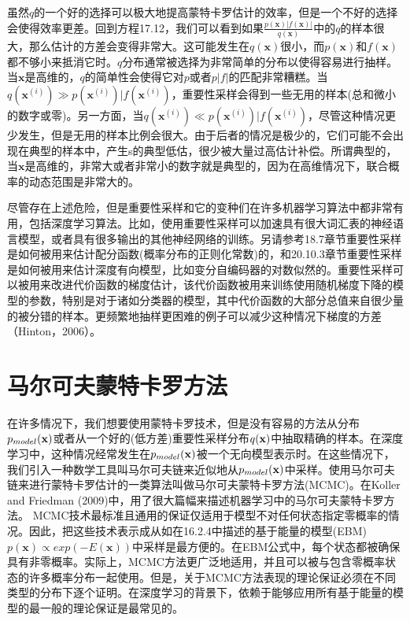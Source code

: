 虽然\(q\)的一个好的选择可以极大地提高蒙特卡罗估计的效率，但是一个不好的选择会使得效率更差。回到方程17.12，我们可以看到如果\( \frac { p(\bm{x})|f(\bm{x})| }{ q(\bm{x}) } \)中的\(q\)的样本很大，那么估计的方差会变得非常大。这可能发生在\(q(\bm{x})\)很小，而\(p(\bm{x})\)和\(f(\bm{x})\)都不够小来抵消它时。\(q\)分布通常被选择为非常简单的分布以使得容易进行抽样。当\(\bm{x}\)是高维的，\(q\)的简单性会使得它对\(p\)或者\(p|f|\)的匹配非常糟糕。当\(q({\bm{x}}^{ (i) })\gg p({\bm{x}}^{ (i) })|f({\bm{x}}^{ (i) })\)，重要性采样会得到一些无用的样本(总和微小的数字或零)。另一方面，当\(q({\bm{x}}^{ (i) })\ll p({\bm{x}}^{ (i) })|f({\bm{x}}^{ (i) })\)，尽管这种情况更少发生，但是无用的样本比例会很大。由于后者的情况是极少的，它们可能不会出现在典型的样本中，产生s的典型低估，很少被大量过高估计补偿。所谓典型的，当\(\bm{x}\)是高维的，非常大或者非常小的数字就是典型的，因为在高维情况下，联合概率的动态范围是非常大的。

尽管存在上述危险，但是重要性采样和它的变种们在许多机器学习算法中都非常有用，包括深度学习算法。比如，使用重要性采样可以加速具有很大词汇表的神经语言模型，或者具有很多输出的其他神经网络的训练。另请参考18.7章节重要性采样是如何被用来估计配分函数(概率分布的正则化常数)的，和20.10.3章节重要性采样是如何被用来估计深度有向模型，比如变分自编码器的对数似然的。重要性采样可以被用来改进代价函数的梯度估计，该代价函数被用来训练使用随机梯度下降的模型的参数，特别是对于诸如分类器的模型，其中代价函数的大部分总值来自很少量的被分错的样本。更频繁地抽样更困难的例子可以减少这种情况下梯度的方差（Hinton，2006）。

\section{马尔可夫蒙特卡罗方法}
在许多情况下，我们想要使用蒙特卡罗技术，但是没有容易的方法从分布\({ p }_{ model }(\bf{x})\)或者从一个好的(低方差)重要性采样分布\(q(\bf{x})\)中抽取精确的样本。在深度学习中，这种情况经常发生在\({ p }_{ model }(\bf{x})\)被一个无向模型表示时。在这些情况下，我们引入一种数学工具叫马尔可夫链来近似地从\({ p }_{ model }(\bf{x})\)中采样。使用马尔可夫链来进行蒙特卡罗估计的一类算法叫做马尔可夫蒙特卡罗方法(MCMC)。在Koller and Friedman (2009)中，用了很大篇幅来描述机器学习中的马尔可夫蒙特卡罗方法。
MCMC技术最标准且通用的保证仅适用于模型不对任何状态指定零概率的情况。因此，把这些技术表示成从如在16.2.4中描述的基于能量的模型(EBM) \(p(\bm{x})\propto exp(-E(\bm{x}))\)中采样是最方便的。在EBM公式中，每个状态都被确保具有非零概率。实际上，MCMC方法更广泛地适用，并且可以被与包含零概率状态的许多概率分布一起使用。但是，关于MCMC方法表现的理论保证必须在不同类型的分布下逐个证明。在深度学习的背景下，依赖于能够应用所有基于能量的模型的最一般的理论保证是最常见的。

